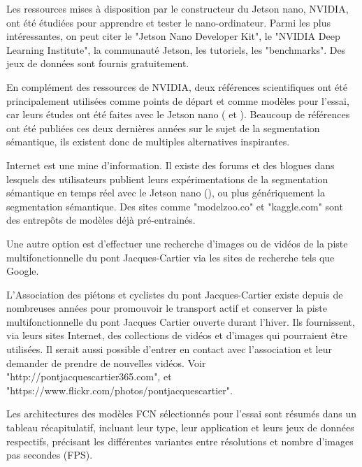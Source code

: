 ﻿\par Les ressources mises à disposition par le constructeur du Jetson nano, NVIDIA, ont été étudiées pour apprendre et tester le nano-ordinateur. Parmi les plus intéressantes, on peut citer le "Jetson Nano Developer Kit", le "NVIDIA Deep Learning Institute", la communauté Jetson, les tutoriels, les "benchmarks". Des jeux de données sont fournis gratuitement.
\par En complément des ressources de NVIDIA, deux références scientifiques ont été principalement utilisées comme points de départ et comme modèles pour l'essai, car leurs études ont été faites avec le Jetson nano (\cite{nguyen_mavnet_2019} et \cite{chong_real-time_1992}). Beaucoup de références ont été publiées ces deux dernières années sur le sujet de la segmentation sémantique, ils existent donc de multiples alternatives inspirantes.
\par Internet est une mine d'information. Il existe des forums et des blogues dans lesquels des utilisateurs publient leurs expérimentations de la segmentation sémantique en temps réel avec le Jetson nano (\cite{dustin_realtime_2019}), ou plus génériquement la segmentation sémantique. Des sites comme "modelzoo.co" et "kaggle.com" sont des entrepôts de modèles déjà pré-entrainés. 
\par Une autre option est d'effectuer une recherche d'images ou de vidéos de la piste multifonctionnelle du pont Jacques-Cartier via les sites de recherche tels que Google. 
\par L'Association des piétons et cyclistes du pont Jacques-Cartier existe depuis de nombreuses années pour promouvoir le transport actif et conserver la piste multifonctionnelle du pont Jacques Cartier ouverte durant l'hiver. Ils fournissent, via leurs sites Internet, des collections de vidéos et d'images qui pourraient être utilisées. Il serait aussi possible d'entrer en contact avec l'association et leur demander de prendre de nouvelles vidéos. Voir "http://pontjacquescartier365.com", et\\"https://www.flickr.com/photos/pontjacquescartier".
\par Les architectures des modèles FCN sélectionnés pour l'essai sont résumés dans un tableau récapitulatif, incluant leur type, leur application et leurs jeux de données respectifs, précisant les différentes variantes entre résolutions et nombre d'images pas secondes (FPS).
